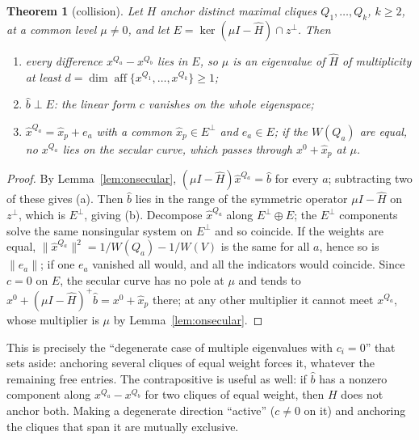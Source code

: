 \documentclass[11pt]{article}
\newtheorem{thm}{Theorem}[section]
\theoremstyle{definition}
\theoremstyle{remark}
\newcommand{\hH}{\hat{H}}
\newcommand{\hb}{\hat{b}}
\newcommand{\hx}{\hat{x}}
\DeclareMathOperator{\aff}{aff}
\begin{document}
\begin{thm}[collision]
\label{thm:collision}
Let $H$ anchor distinct maximal cliques $Q_1,\ldots,Q_k$, $k\geq2$, at a
common level $\mu\neq0$, and let $E=\ker(\mu I-\hH)\cap z^\perp$. Then
\begin{enumerate}
\item[(a)] every difference $x^{Q_a}-x^{Q_b}$ lies in $E$, so $\mu$ is an
eigenvalue of $\hH$ of multiplicity at least
$d=\dim\aff\{x^{Q_1},\ldots,x^{Q_k}\}\geq1$;
\item[(b)] $\hb\perp E$: the linear form $c$ vanishes on the whole
eigenspace;
\item[(c)] $\hx^{Q_a}=\hx_p+e_a$ with a common $\hx_p\in E^\perp$ and
$e_a\in E$; if the $W(Q_a)$ are equal, no $x^{Q_a}$ lies on the secular
curve, which passes through $x^0+\hx_p$ at $\mu$.
\end{enumerate}
\end{thm}
\begin{proof}
By Lemma~\ref{lem:onsecular}, $(\mu I-\hH)\hx^{Q_a}=\hb$ for every $a$;
subtracting two of these gives (a). Then $\hb$ lies in the range of the
symmetric operator $\mu I-\hH$ on $z^\perp$, which is $E^\perp$, giving
(b). Decompose $\hx^{Q_a}$ along $E^\perp\oplus E$; the $E^\perp$
components solve the same nonsingular system on $E^\perp$ and so coincide.
If the weights are equal,
$\|\hx^{Q_a}\|^2=1/W(Q_a)-1/W(V)$ is the same for all $a$, hence so is
$\|e_a\|$; if one $e_a$ vanished all would, and all the indicators would
coincide. Since $c=0$ on $E$, the secular curve has no pole at $\mu$ and
tends to $x^0+(\mu I-\hH)^+\hb=x^0+\hx_p$ there; at any other multiplier
it cannot meet $x^{Q_a}$, whose multiplier is $\mu$ by
Lemma~\ref{lem:onsecular}.
\end{proof}

This is precisely the ``degenerate case of multiple eigenvalues with
$c_i=0$'' that \cite[Section~5]{CW} sets aside: anchoring several cliques
of equal weight forces it, whatever the remaining free entries. The
contrapositive is useful as well: if $\hb$ has a nonzero component along
$x^{Q_a}-x^{Q_b}$ for two cliques of equal weight, then $H$ does not anchor
both. Making a degenerate direction ``active'' ($c\neq0$ on it) and
anchoring the cliques that span it are mutually exclusive.
\end{document}
